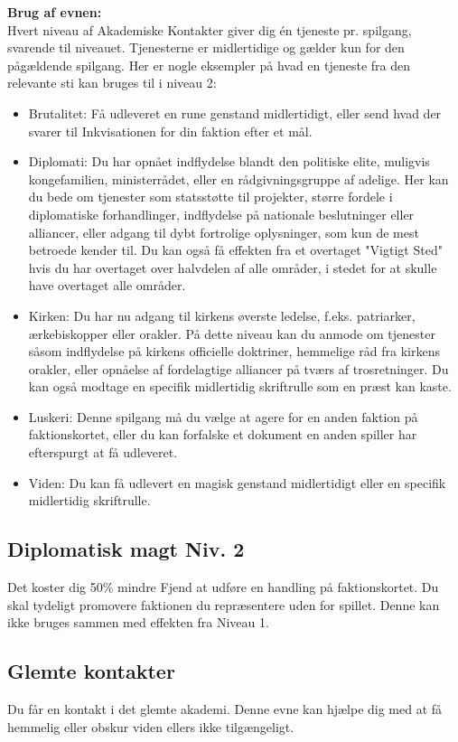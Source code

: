 \textbf{Brug af evnen:}\\
Hvert niveau af Akademiske Kontakter giver dig én tjeneste pr. spilgang, svarende til niveauet. Tjenesterne er midlertidige og gælder kun for den pågældende spilgang. Her er nogle eksempler på hvad en tjeneste fra den relevante sti kan bruges til i niveau 2:\\
\begin{itemize}
    \item Brutalitet: Få udleveret en rune genstand midlertidigt, eller send hvad der svarer til Inkvisationen for din faktion efter et mål.
    \item Diplomati: Du har opnået indflydelse blandt den politiske elite, muligvis kongefamilien, ministerrådet, eller en rådgivningsgruppe af adelige. Her kan du bede om tjenester som statsstøtte til projekter, større fordele i diplomatiske forhandlinger, indflydelse på nationale beslutninger eller alliancer, eller adgang til dybt fortrolige oplysninger, som kun de mest betroede kender til. Du kan også få effekten fra et overtaget "Vigtigt Sted" hvis du har overtaget over halvdelen af alle områder, i stedet for at skulle have overtaget alle områder.
    \item Kirken: Du har nu adgang til kirkens øverste ledelse, f.eks. patriarker, ærkebiskopper eller orakler. På dette niveau kan du anmode om tjenester såsom indflydelse på kirkens officielle doktriner, hemmelige råd fra kirkens orakler, eller opnåelse af fordelagtige alliancer på tværs af trosretninger. Du kan også modtage en specifik midlertidig skriftrulle som en præst kan kaste.
    \item Luskeri: Denne spilgang må du vælge at agere for en anden faktion på faktionskortet, eller du kan forfalske et dokument en anden spiller har efterspurgt at få udleveret.
    \item Viden: Du kan få udlevert en magisk genstand midlertidigt eller en specifik midlertidig skriftrulle. 
\end{itemize}

\subsection*{Diplomatisk magt Niv. 2}
Det koster dig 50\% mindre Fjend at udføre en handling på faktionskortet. Du skal tydeligt promovere faktionen du repræsentere uden for spillet. Denne kan ikke bruges sammen med effekten fra Niveau 1.

\subsection*{Glemte kontakter}
Du får en kontakt i det glemte akademi. Denne evne kan hjælpe dig med at få hemmelig eller obskur viden ellers ikke tilgængeligt.

